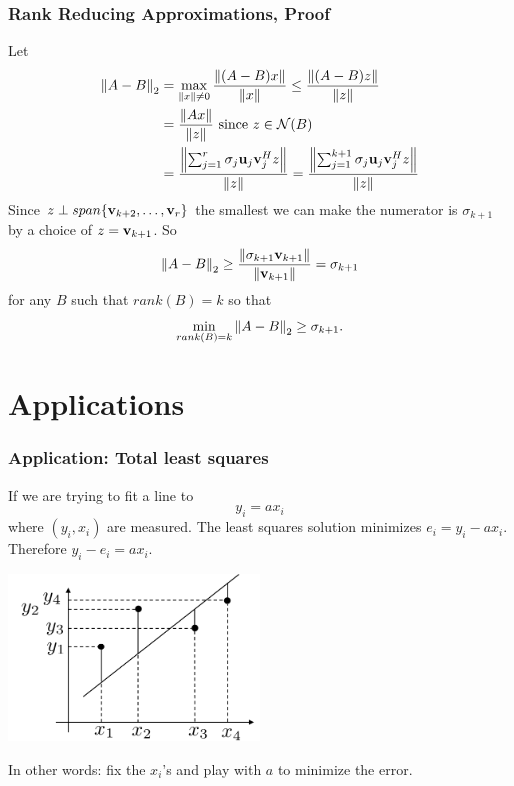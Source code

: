 \documentclass{beamer}
\begin{document}
\begin{frame}\frametitle{Rank Reducing Approximations, Proof}
	Let 
	\begin{align*}
		\left\|A-B \right\|_2 
			&= \max_{\left\|x \right\|\neq 0}\frac{\left\|(A-B)x \right\|}{\left\|x \right\|} \leq \frac{\left\|(A-B)z \right\|}{\left\|z \right\|} \\
			&= \frac{\left\|Ax \right\|}{\left\|z \right\|} \text{ since } z \in \mathcal{N}(B) \\
			&= \frac{\left\|\sum_{j=1}^r\sigma_j\mathbf{u}_j\mathbf{v}_j^Hz \right\|}{\left\|z \right\|} = \frac{\left\|\sum_{j=1}^{k+1}\sigma_j\mathbf{u}_j\mathbf{v}_j^Hz \right\|}{\left\|z \right\|}
	\end{align*}	
	Since $z \perp span\{\mathbf{v}_{k+2},\ldots,\mathbf{v}_r\}$ the smallest we can make the numerator is $\sigma_{k+1}$ by a choice of $z = \mathbf{v}_{k+1}$.  So
	\[ 
		\left\|A-B \right\|_2 
			\geq \frac{\left\|\sigma_{k+1 }\mathbf{v}_{k+1}\right\|}{\left\|\mathbf{v}_{k+1} \right\|} 
			= \sigma_{k+1} 
	\]
	for any $B$ such that $rank(B) = k$ so that
	\[ 
		\min_{rank(B) = k}\left\|A-B \right\|_2 \geq \sigma_{k+1}.
	\]
\end{frame}

\section{Applications}
\frame{\sectionpage}

\begin{frame}\frametitle{Application:  Total least squares}
	If we are trying to fit a line to
	\[ 
		y_i = ax_i
	\]
	where $(y_i,x_i)$ are measured.  The least squares solution minimizes $e_i = y_i-ax_i$.
	Therefore $y_i - e_i = ax_i$.
	\begin{center}
		\includegraphics[width=0.5\textwidth]
			{figures/chap7_total_least_squares}
	\end{center}
	In other words: fix the $x_i$'s and play with $a$ to minimize the error.	
\end{frame}
\end{document}
